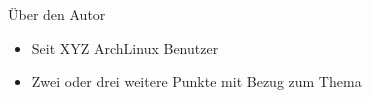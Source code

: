 
\begin{slide}{Über den Autor}
	\begin{itemize}
		\item{Seit XYZ ArchLinux Benutzer}
		\item{Zwei oder drei weitere Punkte mit Bezug zum Thema}
	\end{itemize}
\end{slide}
